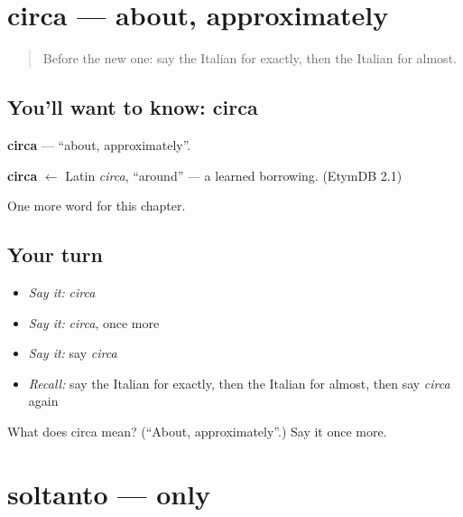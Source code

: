 \section[circa]{circa — about, approximately}

\label{lesson:IT-C244-circa}



\begin{quote}
Before the new one: say the Italian for exactly, then the Italian for almost.
\end{quote}

\subsection*{You'll want to know: circa}
\textbf{circa} — \textquotedblleft{}about, approximately\textquotedblright{}.

\begin{cousinweb}
\textbf{circa} $\leftarrow$ Latin \emph{circa}, \textquotedblleft{}around\textquotedblright{} — a learned borrowing. (EtymDB 2.1)
\end{cousinweb}

\begin{grammarlens}[title={What you've built}]
One more word for this chapter.
\end{grammarlens}

\subsection*{Your turn}
\begin{itemize}
\raggedright
  \item \emph{Say it:} \emph{circa}
  \item \emph{Say it:} \emph{circa}, once more
  \item \emph{Say it:} say \emph{circa}
  \item \emph{Recall:} say the Italian for exactly, then the Italian for almost, then say \emph{circa} again
\end{itemize}

\begin{tcolorbox}[breakable,colback=teal!4,colframe=teal!35!black,title={Before you move on}]
What does circa mean? (\textquotedblleft{}About, approximately\textquotedblright{}.) Say it once more.
\end{tcolorbox}
\section[soltanto]{soltanto — only}

